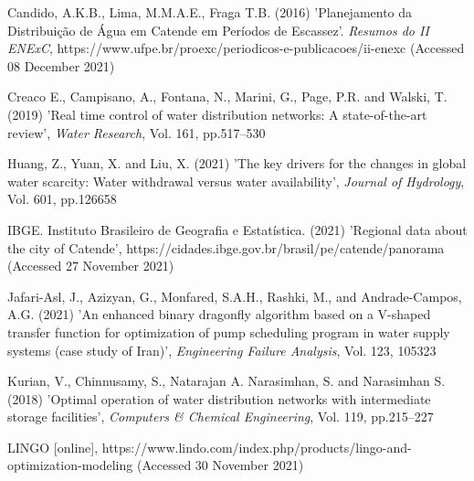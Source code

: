 \documentclass{singlecol}
\theoremstyle{TH}{
\newtheorem{lemma}{Lemma}
\newtheorem{theorem}[lemma]{Theorem}
\newtheorem{corrolary}[lemma]{Corrolary}
\newtheorem{conjecture}[lemma]{Conjecture}
\newtheorem{proposition}[lemma]{Proposition}
\newtheorem{claim}[lemma]{Claim}
\newtheorem{stheorem}[lemma]{Wrong Theorem}
\newtheorem{algorithm}{Algorithm}
}
\theoremstyle{THrm}{
\newtheorem{definition}{Definition}[section]
\newtheorem{question}{Question}[section]
\newtheorem{remark}{Remark}
\newtheorem{scheme}{Scheme}
}
\theoremstyle{THhit}{
\newtheorem{case}{Case}[section]
}
\begin{document}

%
%
%

\begin{thebibliography}{10}

Candido, A.K.B., Lima, M.M.A.E., Fraga T.B. (2016) 'Planejamento da Distribuição de Água em Catende em Períodos de Escassez'. {\it Resumos do II ENExC}, https://www.ufpe.br/proexc/periodicos-e-publicacoes/ii-enexc (Accessed 08 December 2021) 

Creaco E., Campisano, A., Fontana, N.,  Marini, G., Page, P.R. and Walski, T. (2019) 'Real time control of water distribution networks: A state-of-the-art
review', {\it Water Research}, Vol. 161, pp.517--530

Huang, Z., Yuan, X. and  Liu, X. (2021) 'The key drivers for the changes in global water scarcity: Water withdrawal versus water availability', {\it Journal of Hydrology}, Vol. 601, pp.126658

IBGE. Instituto Brasileiro de Geografia e Estatística. (2021) 'Regional data about the city of Catende',
https://cidades.ibge.gov.br/brasil/pe/catende/panorama (Accessed 27 November 2021)

Jafari-Asl, J., Azizyan, G., Monfared, S.A.H., Rashki, M., and Andrade-Campos, A.G. (2021) 'An enhanced binary dragonfly algorithm based on a V-shaped
transfer function for optimization of pump scheduling program in water supply systems (case study of Iran)', {\it Engineering Failure Analysis}, Vol. 123, 105323

Kurian, V., Chinnusamy, S., Natarajan A. Narasimhan, S. and Narasimhan S. (2018) 'Optimal operation of water distribution networks with intermediate storage facilities', {\it Computers \& Chemical Engineering}, Vol. 119, pp.215--227

LINGO [online], https://www.lindo.com/index.php/products/lingo-and-optimization-modeling (Accessed 30 November 2021)


\end{thebibliography}
\end{document}
